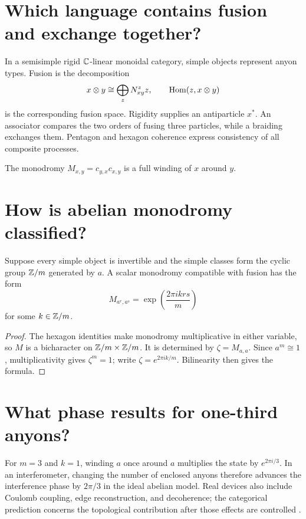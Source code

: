 \section{Which language contains fusion and exchange together?}

In a semisimple rigid $\mathbb C$-linear monoidal category, simple objects represent
anyon types.  Fusion is the decomposition
\[
x\otimes y\cong\bigoplus_z N_{xy}^z z,
\qquad
\operatorname{Hom}(z,x\otimes y)
\]
is the corresponding fusion space.  Rigidity supplies an antiparticle $x^*$.
An associator compares the two orders of fusing three particles, while a
braiding exchanges them.  Pentagon and hexagon coherence express consistency
of all composite processes.

The monodromy $M_{x,y}=c_{y,x}c_{x,y}$ is a full winding of $x$ around $y$.

\section{How is abelian monodromy classified?}

\begin{theorem}
Suppose every simple object is invertible and the simple classes form the
cyclic group $\mathbb Z/m$ generated by $a$.  A scalar monodromy compatible with
fusion has the form
\[
M_{a^r,a^s}=\exp\!\left(\frac{2\pi i krs}{m}\right)
\]
for some $k\in\mathbb Z/m$.
\end{theorem}

\begin{proof}
The hexagon identities make monodromy multiplicative in either variable, so
$M$ is a bicharacter on $\mathbb Z/m\times\mathbb Z/m$.  It is determined by
$\zeta=M_{a,a}$.  Since $a^m\cong1$, multiplicativity gives $\zeta^m=1$;
write $\zeta=e^{2\pi ik/m}$.  Bilinearity then gives the formula.
\end{proof}

\section{What phase results for one-third anyons?}

For $m=3$ and $k=1$, winding $a$ once around $a$ multiplies the state by
$e^{2\pi i/3}$.  In an interferometer, changing the number of enclosed anyons
therefore advances the interference phase by $2\pi/3$ in the ideal abelian
model.  Real devices also include Coulomb coupling, edge reconstruction, and
decoherence; the categorical prediction concerns the topological contribution
after those effects are controlled \cite{nakamura}.


